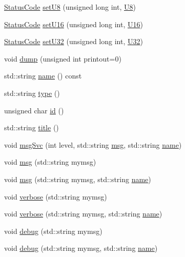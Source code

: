 \begin{DoxyCompactItemize}
\item 
\hyperlink{classStatusCode}{Status\+Code} \hyperlink{classIOdata_a6c4fb2f2af01889ada889c2b7aceb24d}{set\+U8} (unsigned long int, \hyperlink{classIOdata_a18d1354b7cdaf0f8a8001fdbb3ced418}{U8})
\item 
\hyperlink{classStatusCode}{Status\+Code} \hyperlink{classIOdata_aa9ade5ce3944c8e2b831533b6f876caf}{set\+U16} (unsigned long int, \hyperlink{classIOdata_a1eb45b348534a7c19a4a99b746e693ff}{U16})
\item 
\hyperlink{classStatusCode}{Status\+Code} \hyperlink{classIOdata_abbed9a057203bc763f97b85fb385f36b}{set\+U32} (unsigned long int, \hyperlink{classIOdata_a96fb57f5fcd87b708743abd3c86a5198}{U32})
\item 
void \hyperlink{classIOdata_a208e24222bf2044a4ff8bbb1a6bdc13b}{dump} (unsigned int printout=0)
\item 
std\+::string \hyperlink{classObject_a300f4c05dd468c7bb8b3c968868443c1}{name} () const
\item 
std\+::string \hyperlink{classObject_a84f99f70f144a83e1582d1d0f84e4e62}{type} ()
\item 
unsigned char \hyperlink{classObject_af99145335cc61ff6e2798ea17db009d2}{id} ()
\item 
std\+::string \hyperlink{classObject_a73a0f1a41828fdd8303dd662446fb6c3}{title} ()
\item 
void \hyperlink{classObject_a3f9d5537ebce0c0f2bf6ae4d92426f3c}{msg\+Svc} (int level, std\+::string \hyperlink{classObject_a58b2d0618c2d08cf2383012611528d97}{msg}, std\+::string \hyperlink{classObject_a300f4c05dd468c7bb8b3c968868443c1}{name})
\item 
void \hyperlink{classObject_a58b2d0618c2d08cf2383012611528d97}{msg} (std\+::string mymsg)
\item 
void \hyperlink{classObject_ac5d59299273cee27aacf7de00d2e7034}{msg} (std\+::string mymsg, std\+::string \hyperlink{classObject_a300f4c05dd468c7bb8b3c968868443c1}{name})
\item 
void \hyperlink{classObject_a83d2db2df682907ea1115ad721c1c4a1}{verbose} (std\+::string mymsg)
\item 
void \hyperlink{classObject_a2d4120195317e2a3c6532e8bb9f3da68}{verbose} (std\+::string mymsg, std\+::string \hyperlink{classObject_a300f4c05dd468c7bb8b3c968868443c1}{name})
\item 
void \hyperlink{classObject_aac010553f022165573714b7014a15f0d}{debug} (std\+::string mymsg)
\item 
void \hyperlink{classObject_a6c9a0397ca804e04d675ed05683f5420}{debug} (std\+::string mymsg, std\+::string \hyperlink{classObject_a300f4c05dd468c7bb8b3c968868443c1}{name})

\end{DoxyCompactItemize}
